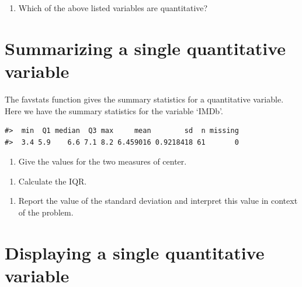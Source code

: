 \documentclass[
]{report}
\providecommand{\tightlist}{%
  \setlength{\itemsep}{0pt}\setlength{\parskip}{0pt}}
\begin{document}
\begin{enumerate}
\def\labelenumi{\arabic{enumi}.}
\setcounter{enumi}{2}
\tightlist
\item
  Which of the above listed variables are quantitative?
\end{enumerate}

\vspace{1in}

\hypertarget{summarizing-a-single-quantitative-variable}{%
\section{Summarizing a single quantitative variable}\label{summarizing-a-single-quantitative-variable}}

The favstats function gives the summary statistics for a quantitative variable. Here we have the summary statistics for the variable `IMDb'.

\begin{verbatim}
#>  min  Q1 median  Q3 max     mean        sd  n missing
#>  3.4 5.9    6.6 7.1 8.2 6.459016 0.9218418 61       0
\end{verbatim}

\begin{enumerate}
\def\labelenumi{\arabic{enumi}.}
\setcounter{enumi}{3}
\tightlist
\item
  Give the values for the two measures of center.
\end{enumerate}

\vspace{0.5in}

\begin{enumerate}
\def\labelenumi{\arabic{enumi}.}
\setcounter{enumi}{4}
\tightlist
\item
  Calculate the IQR.
\end{enumerate}

\vspace{0.5in}

\begin{enumerate}
\def\labelenumi{\arabic{enumi}.}
\setcounter{enumi}{5}
\tightlist
\item
  Report the value of the standard deviation and interpret this value in context of the problem.
  \vspace{1in}
\end{enumerate}

\hypertarget{displaying-a-single-quantitative-variable}{%
\section{Displaying a single quantitative variable}\label{displaying-a-single-quantitative-variable}}
\end{document}
